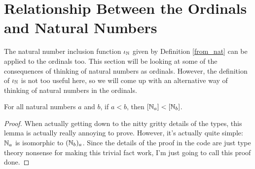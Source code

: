 \documentclass[../../math.tex]{subfiles}
\begin{document}
\section{Relationship Between the Ordinals and Natural Numbers}

The natural number inclusion function $\iota_{\mathbb{N}}$ given by Definition \ref{from_nat}
can be applied to the ordinals too.  This section will be looking at some of the
consequences of thinking of natural numbers as ordinals.  However, the
definition of $\iota_{\mathbb{N}}$ is not too useful here, so we will come up with an
alternative way of thinking of natural numbers in the ordinals.

\begin{lemma} \label{nat_to_ord_lt}
    For all natural numbers $a$ and $b$, if $a < b$, then $[\mathbb{N}_a] < [\mathbb{N}_b]$.
\end{lemma}
\begin{proof}
    When actually getting down to the nitty gritty details of the types, this
    lemma is actually really annoying to prove.  However, it's actually quite
    simple: $\mathbb{N}_a$ is isomorphic to $(\mathbb{N}_b)_a$.  Since the details of the proof
    in the code are just type theory nonsense for making this trivial fact work,
    I'm just going to call this proof done.
\end{proof}
\end{document}

